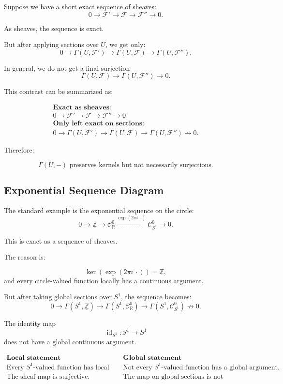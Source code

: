 \documentclass[12pt,a4paper]{article}
\DeclareMathOperator{\id}{id}
\newcommand{\F}{\mathcal F}
\newcommand{\RR}{\mathbb{R}}
\newcommand{\ZZ}{\mathbb{Z}}
\newcommand{\Czero}{\mathcal C^0}        %
\theoremstyle{notespace}
\newcommand{\Fp}{\mathcal F'}      %
\newcommand{\Fpp}{\mathcal F''}
\newcommand{\SSone}{S^1}
\begin{document}
Suppose we have a short exact sequence of sheaves:
\[
0\to \Fp\to \F\to \Fpp\to 0.
\]

As sheaves, the sequence is exact.

But after applying sections over \(U\), we get only:
\[
0\to \Gamma(U,\Fp)\to \Gamma(U,\F)\to \Gamma(U,\Fpp).
\]

In general, we do not get a final surjection
\[
\Gamma(U,\F)\to \Gamma(U,\Fpp)\to 0.
\]

This contrast can be summarized as:

\[
\begin{array}{c}
	\textbf{Exact as sheaves:}\\[0.2cm]
	0\to \Fp\to \F\to \Fpp\to 0
	\\[0.8cm]
	\textbf{Only left exact on sections:}\\[0.2cm]
	0\to \Gamma(U,\Fp)\to \Gamma(U,\F)\to \Gamma(U,\Fpp)
	\not\to 0.
\end{array}
\]

Therefore:

\[
\boxed{
	\Gamma(U,-)\text{ preserves kernels but not necessarily surjections.}
}
\]

\subsection{Exponential Sequence Diagram}

The standard example is the exponential sequence on the circle:
\[
0\to \underline{\ZZ}
\to \Czero_{\RR}
\xrightarrow{\exp(2\pi i\,\cdot)}
\Czero_{\SSone}
\to 0.
\]

This is exact as a sequence of sheaves.

The reason is:

\[
\ker\left(\exp(2\pi i\,\cdot)\right)=\underline{\ZZ},
\]
and every circle-valued function locally has a continuous argument.

But after taking global sections over \(S^1\), the sequence becomes:
\[
0\to \Gamma(S^1,\underline{\ZZ})
\to \Gamma(S^1,\Czero_{\RR})
\to \Gamma(S^1,\Czero_{\SSone})
\not\to 0.
\]

The identity map
\[
\id_{S^1}:S^1\to S^1
\]
does not have a global continuous argument.

\[
\begin{array}{c|c}
	\textbf{Local statement} & \textbf{Global statement} \\
	\hline
	\text{Every }S^1\text{-valued function has local arguments.}
	&
	\text{Not every }S^1\text{-valued function has a global argument.}
	\\[0.2cm]
	\text{The sheaf map is surjective.}
	&
	\text{The map on global sections is not surjective.}
\end{array}
\]
\end{document}
